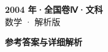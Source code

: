 \documentclass[zihao=-4, a4paper]{ctexart}
\begin{document}
\begin{center}
  {\Large\bfseries 2004 年·全国卷Ⅳ·文科}\\[4pt]
  {\large 数学 · 解析版}
\end{center}
\medskip
{}

\clearpage
{}
\begin{center}{\Large\bfseries 参考答案与详细解析}\end{center}
\medskip

\end{document}

